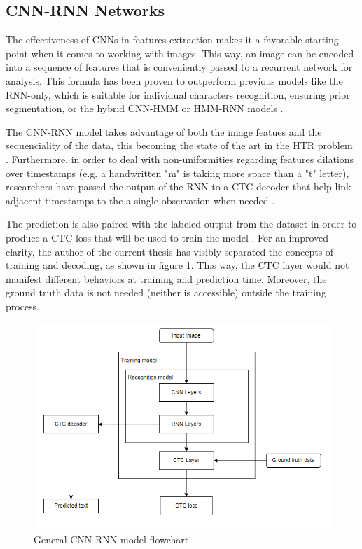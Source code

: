 \subsection{CNN-RNN Networks}
\label{subsec:ch4sec1subsec2}

The effectiveness of CNNs in features extraction makes it a favorable starting point when it comes to working with images. This way, an image can be encoded into a sequence of features that is conveniently passed to a recurrent network for analysis. This formula has been proven to outperform previous models like the RNN-only, which is suitable for individual characters recognition, ensuring prior segmentation, or the hybrid CNN-HMM or HMM-RNN models \cite{Juan}. 

The CNN-RNN model takes advantage of both the image featues and the sequenciality of the data, this becoming the state of the art in the HTR problem \cite{Juan}. Furthermore, in order to deal with non-uniformities regarding features dilations over timestamps (e.g. a handwritten "m" is taking more space than a "t" letter), researchers have passed the output of the RNN to a CTC decoder that help link adjacent timestamps to the a single observation when needed \cite{cnnrnn}. 

The prediction is also paired with the labeled output from the dataset in order to produce a CTC loss that will be used to train the model \cite{cnnrnn}. For an improved clarity, the author of the current thesis has visibly separated the concepts of training and decoding, as shown in figure \ref{FigCNNRNN}. This way, the CTC layer would not manifest different behaviors at training and prediction time. Moreover, the ground truth data is not needed (neither is accessible) outside the training process.

\begin{figure}[htbp]
	\centering
		\includegraphics[scale=0.75]{figures/cnn_rnn_model}
	\caption{General CNN-RNN model flowchart}
	\label{FigCNNRNN}        
\end{figure}

